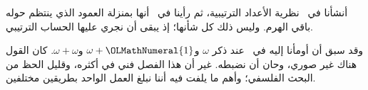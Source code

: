 \documentclass[../../../include/open-logic-section]{subfiles}
\begin{document}


أنشأنا في~ نظرية الأعداد الترتيبية، ثم رأينا
في~ أنها بمنزلة العمود الذي ينتظم حوله باقي
الهرم. وليس ذلك كل شأنها؛ إذ يبقى أن نجري عليها الحساب الترتيبي.

وقد سبق أن أومأنا إليه في~ عند ذكر
$\omega$ و$\omega+\OLMathNumeral{1}$ و$\omega+\omega$. كان القول هناك غير صوري،
وحان أن نضبطه. غير أن هذا الفصل فني في أكثره، وقليل الحظ من البحث
الفلسفي؛ وأهم ما يلفت فيه أننا نبلغ العمل الواحد بطريقين مختلفين.
\end{document}
